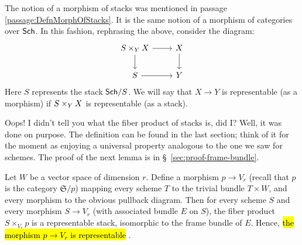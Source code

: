 \documentclass[12pt]{memoir}
\makeatletter
\newcommand{\roundedhighlight}[1]{%
  \begingroup
  \setuloverlap{2pt}%
  \def\SOUL@ulunderline##1{{%
    \setbox\z@\hbox{##1}%
    \rlap{\SOUL@ulcolor{\tikz[overlay,blend mode=darken]{%
      \fill[rounded corners=2pt]
        (-\SOUL@uloverlap,-\SOUL@uldp)
        rectangle (\dimexpr\wd\z@+\SOUL@uloverlap\relax,\SOUL@ulht);%
    }}}%
    \unhcopy\z@
  }}%
  \hl{#1}%
  \endgroup
}
\DeclareRobustCommand{\hlgreen}[1]{{\sethlcolor{notegreen}\roundedhighlight{#1}}}
\newcounter{passage}
\makeatother
\begin{document}
\begin{ptcb}
    The notion of a morphism of stacks was mentioned in passage \ref{passage:DefnMorphOfStacks}. It is the same notion of a morphism of categories over \(\mathsf{Sch}\). In this fashion, rephrasing the above, consider the diagram:
        \[
            \begin{tikzcd}
                S\x_YX \arrow[r] \arrow[d] & X \arrow[d] \\
                S \arrow[r]                & Y          
            \end{tikzcd}
        \]
    Here \(S\) represents the stack \(\mathsf{Sch}/S\). We will say that \(X\to Y\) is representable (as a morphism) if \(S\times_YX \) is representable (as a stack).
\end{ptcb}

Oops! I didn't tell you what the fiber product of stacks is, did I? Well, it was done on purpose. The definition can be found in the last section; think of it for the moment as enjoying a universal property analogous to the one we saw for schemes. The proof of the next lemma is in \S~\ref{sec:proof-frame-bundle}.

\begin{Lem}\label{lem:4.6}
Let $W$ be a vector space of dimension $r$. Define a morphism $p \to V_r$ (recall that $p$ is the category $\mathfrak{S}/p$) mapping every scheme $T$ to the trivial bundle $T \times W$, and every morphism to the obvious pullback diagram. Then for every scheme $S$ and every morphism $S \to V_r$ (with associated bundle $E$ on $S$), the fiber product $S \times_{V_r} p$ is a representable stack, isomorphic to the frame bundle of $E$. Hence, \hlgreen{the morphism $p \to V_r$ is representable}.
\end{Lem}
\end{document}
